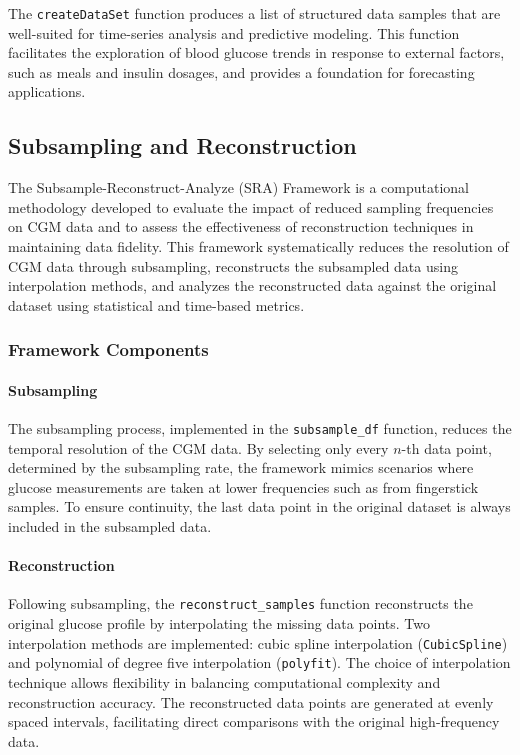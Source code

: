 The \texttt{createDataSet} function produces a list of structured data samples that are well-suited for time-series analysis and predictive modeling. This function facilitates the exploration of blood glucose trends in response to external factors, such as meals and insulin dosages, and provides a foundation for forecasting applications.

\subsection{Subsampling and Reconstruction}
The Subsample-Reconstruct-Analyze (SRA) Framework is a computational methodology developed to evaluate the impact of reduced sampling frequencies on CGM data and to assess the effectiveness of reconstruction techniques in maintaining data fidelity. This framework systematically reduces the resolution of CGM data through subsampling, reconstructs the subsampled data using interpolation methods, and analyzes the reconstructed data against the original dataset using statistical and time-based metrics.

\subsubsection{Framework Components}
\paragraph{Subsampling} The subsampling process, implemented in the \texttt{subsample\_df} function, reduces the temporal resolution of the CGM data. By selecting only every \(n\)-th data point, determined by the subsampling rate, the framework mimics scenarios where glucose measurements are taken at lower frequencies such as from fingerstick samples. To ensure continuity, the last data point in the original dataset is always included in the subsampled data.

\paragraph{Reconstruction}
Following subsampling, the \texttt{reconstruct\_samples} function reconstructs the original glucose profile by interpolating the missing data points. Two interpolation methods are implemented: cubic spline interpolation (\texttt{CubicSpline}) and polynomial of degree five interpolation (\texttt{polyfit}). The choice of interpolation technique allows flexibility in balancing computational complexity and reconstruction accuracy. The reconstructed data points are generated at evenly spaced intervals, facilitating direct comparisons with the original high-frequency data.

